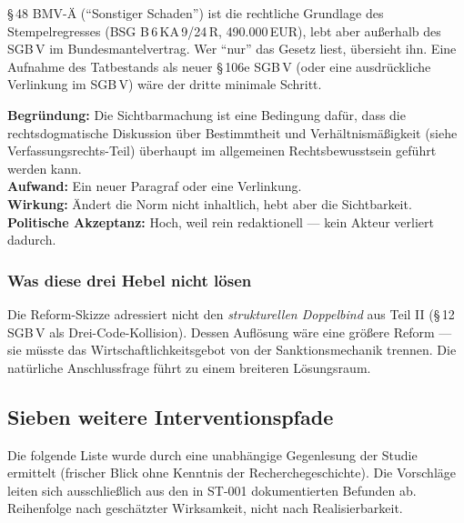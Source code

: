 \documentclass{umbruch-position}
\begin{document}
\S\,48 BMV-Ä (``Sonstiger Schaden'') ist die rechtliche Grundlage des Stempelregresses (BSG B\,6\,KA\,9/24\,R, 490.000\,EUR), lebt aber außerhalb des SGB\,V im Bundesmantelvertrag. Wer ``nur'' das Gesetz liest, übersieht ihn. Eine Aufnahme des Tatbestands als neuer \S\,106e SGB\,V (oder eine ausdrückliche Verlinkung im SGB\,V) wäre der dritte minimale Schritt.

\textbf{Begründung:} Die Sichtbarmachung ist eine Bedingung dafür, dass die rechtsdogmatische Diskussion über Bestimmtheit und Verhältnismäßigkeit (siehe Verfassungsrechts-Teil) überhaupt im allgemeinen Rechtsbewusstsein geführt werden kann.\\
\textbf{Aufwand:} Ein neuer Paragraf oder eine Verlinkung.\\
\textbf{Wirkung:} Ändert die Norm nicht inhaltlich, hebt aber die Sichtbarkeit.\\
\textbf{Politische Akzeptanz:} Hoch, weil rein redaktionell — kein Akteur verliert dadurch.

\subsubsection*{Was diese drei Hebel nicht lösen}

Die Reform-Skizze adressiert nicht den \textit{strukturellen Doppelbind} aus Teil II (\S\,12 SGB\,V als Drei-Code-Kollision). Dessen Auflösung wäre eine größere Reform — sie müsste das Wirtschaftlichkeitsgebot von der Sanktionsmechanik trennen. Die natürliche Anschlussfrage führt zu einem breiteren Lösungsraum.

\subsection{Sieben weitere Interventionspfade}

Die folgende Liste wurde durch eine unabhängige Gegenlesung der Studie ermittelt (frischer Blick ohne Kenntnis der Recherche\-geschichte). Die Vorschläge leiten sich ausschließlich aus den in ST-001 dokumentierten Befunden ab. Reihenfolge nach geschätzter Wirksamkeit, nicht nach Realisierbarkeit.
\end{document}

